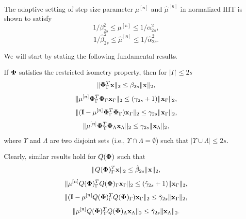 \documentclass[aoas,preprint]{imsart}
\numberwithin{equation}{section}
\theoremstyle{plain}
\begin{document}
{\begin{remark}
The adaptive setting of step size parameter $\mu^{[n]}$ and $\hat{\mu}^{[n]}$ in normalized IHT is shown to satisfy
\begin{equation}\label{bounds_mu}
   1/\beta^2_{2s} \leq \mu^{[n]} \leq 1/\alpha^2_{2s},
\end{equation}
\begin{equation}\label{bounds_muhat}
   1/\hat{\beta}^2_{2s} \leq \hat{\mu}^{[n]} \leq 1/\hat{\alpha}^2_{2s}.
\end{equation}
\end{remark}


We will start by stating the following fundamental results.
\begin{lemma}\label{lemmas_on_phi}
{\rm{\cite{blumensath2010niht}}}
If ${\bf {\bf \Phi}}$ satisfies the restricted isometry property, then for $|\Gamma|\leq 2s$
\begin{equation}\label{mu*phi}
    \| {\bf {\bf \Phi}}_{\Gamma}^T{\bf x}\|_2 \leq \beta_{2s}\|{\bf x} \|_2,
\end{equation}
\begin{equation}\label{mu*phi*phi}
    \| \mu^{[n]}{\bf {\bf \Phi}}_{\Gamma}^T{\bf {\bf \Phi}}_{\Gamma}{\bf x}_{\Gamma}\|_2 \leq (\gamma_{2s}+1)\|{\bf x}_{\Gamma} \|_2,
\end{equation}
\begin{equation}\label{1-mu*phi*phi}
    \| ( {\bf I}- \mu^{[n]}{\bf {\bf \Phi}}_{\Gamma}^T{\bf {\bf \Phi}}_{\Gamma}){\bf x}_{\Gamma}\|_2 \leq \gamma_{2s}\|{\bf x}_{\Gamma} \|_2,
\end{equation}
\begin{equation}\label{mu*phi1*phi2}
     \| \mu^{[n]}{\bf {\bf \Phi}}_{\Upsilon}^T{\bf {\bf \Phi}}_{\Lambda}{\bf x}_{\Lambda}\|_2 \leq \gamma_{2s}\|{\bf x}_{\Lambda} \|_2,
\end{equation}
where $\Upsilon$ and $\Lambda$ are two disjoint sets (i.e., $\Upsilon \cap \Lambda = \emptyset$) such that $|\Upsilon \cup \Lambda| \leq 2s$. 
\end{lemma}
Clearly, similar results hold for $Q(\boldsymbol{{\bf \Phi}})$ such that
\begin{equation}\label{q_mu*phi}
     \|Q({\bf {\bf \Phi}})_{\Gamma}^T{\bf x}\|_2 \leq \hat{\beta}_{2s}\|{\bf x} \|_2,
\end{equation}
\begin{equation}\label{q_mu*phi*phi}
    \| \mu^{[n]}Q({\bf {\bf \Phi}})_{\Gamma}^TQ({\bf {\bf \Phi}})_{\Gamma}{\bf x}_{\Gamma}\|_2 \leq (\hat{\gamma}_{2s}+1)\|{\bf x}_{\Gamma} \|_2,
\end{equation}
\begin{equation}\label{1-q_mu*phi*phi}
    \| ( {\bf I}- \mu^{[n]}Q({\bf {\bf \Phi}})_{\Gamma}^TQ({\bf {\bf \Phi}})_{\Gamma}){\bf x}_{\Gamma}\|_2 \leq \hat{\gamma}_{2s}\|{\bf x}_{\Gamma} \|_2,
\end{equation}
\begin{equation}\label{q_mu*phi1*phi2}
    \| \mu^{[n]}Q({\bf {\bf \Phi}})_{\Upsilon}^TQ({\bf {\bf \Phi}})_{\Lambda}{\bf x}_{\Lambda}\|_2 \leq \hat{\gamma}_{2s}\|{\bf x}_{\Lambda} \|_2.
\end{equation}

}
\end{document}
